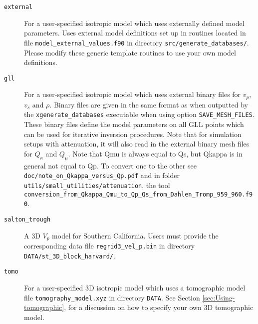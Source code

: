 \begin{description}
\begin{description}
\begin{description}
\item [{\texttt{external}}] For a user-specified isotropic model which
uses externally defined model parameters. Uses external model definitions
set up in routines located in file \texttt{model\_external\_values.f90}
in directory \texttt{src/generate\_databases/}. Please modify these
generic template routines to use your own model definitions.

\item [{\texttt{gll}}] For a user-specified isotropic model which uses
external binary files for $v_{p}$, $v_{s}$ and $\rho$. Binary files
are given in the same format as when outputted by the \texttt{xgenerate\_databases}
executable when using option \texttt{SAVE\_MESH\_FILES}. These binary
files define the model parameters on all GLL points which can be used
for iterative inversion procedures. Note that for simulation setups with attenuation,
it will also read in the external binary mesh files for $Q_{\kappa}$ and $Q_{\mu}$.
Note that Qmu is always equal to Qs, but Qkappa is in general not equal to Qp.
To convert one to the other see \texttt{doc/note\_on\_Qkappa\_versus\_Qp.pdf}
and in folder \texttt{utils/small\_utilities/attenuation}, the tool
\texttt{conversion\_from\_Qkappa\_Qmu\_to\_Qp\_Qs\_from\_Dahlen\_Tromp\_959\_960.f90}.


\item [{\texttt{salton\_trough}}] A 3D $V_{p}$ model for Southern California.
Users must provide the corresponding data file \texttt{regrid3\_vel\_p.bin}
in directory \texttt{DATA/st\_3D\_block\_harvard/}.

\item [{\texttt{tomo}}] For a user-specified 3D isotropic model which uses
a tomographic model file \texttt{tomography\_model.xyz} in directory
\texttt{DATA}. See Section \ref{sec:Using-tomographic}, for a discussion
on how to specify your own 3D tomographic model.
\end{description}
\end{description}


\end{description}
